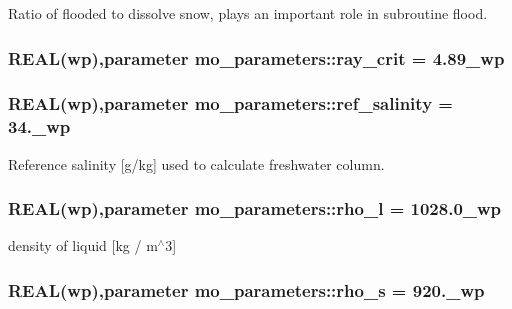 Ratio of flooded to dissolve snow, plays an important role in subroutine flood. 

\hypertarget{namespacemo__parameters_a5f8c574464740cb0fa35f52e8382500d}{
\subsubsection[{ray\_\-crit}]{\setlength{\rightskip}{0pt plus 5cm}REAL({\bf wp}),parameter {\bf mo\_\-parameters::ray\_\-crit} = 4.89\_\-wp}}
\label{namespacemo__parameters_a5f8c574464740cb0fa35f52e8382500d}
\hypertarget{namespacemo__parameters_a2ed9bfc96e43a2ccb5fc932c202bcee1}{
\subsubsection[{ref\_\-salinity}]{\setlength{\rightskip}{0pt plus 5cm}REAL({\bf wp}),parameter {\bf mo\_\-parameters::ref\_\-salinity} = 34.\_\-wp}}
\label{namespacemo__parameters_a2ed9bfc96e43a2ccb5fc932c202bcee1}


Reference salinity \mbox{[}g/kg\mbox{]} used to calculate freshwater column. 

\hypertarget{namespacemo__parameters_a7c9d4f55d958561511f30542576af730}{
\subsubsection[{rho\_\-l}]{\setlength{\rightskip}{0pt plus 5cm}REAL({\bf wp}),parameter {\bf mo\_\-parameters::rho\_\-l} = 1028.0\_\-wp}}
\label{namespacemo__parameters_a7c9d4f55d958561511f30542576af730}


density of liquid \mbox{[}kg / m$^\wedge$3\mbox{]} 

\hypertarget{namespacemo__parameters_a7923c17c60cfcf6ce245f84e5c4aae3d}{
\subsubsection[{rho\_\-s}]{\setlength{\rightskip}{0pt plus 5cm}REAL({\bf wp}),parameter {\bf mo\_\-parameters::rho\_\-s} = 920.\_\-wp}}
\label{namespacemo__parameters_a7923c17c60cfcf6ce245f84e5c4aae3d}



